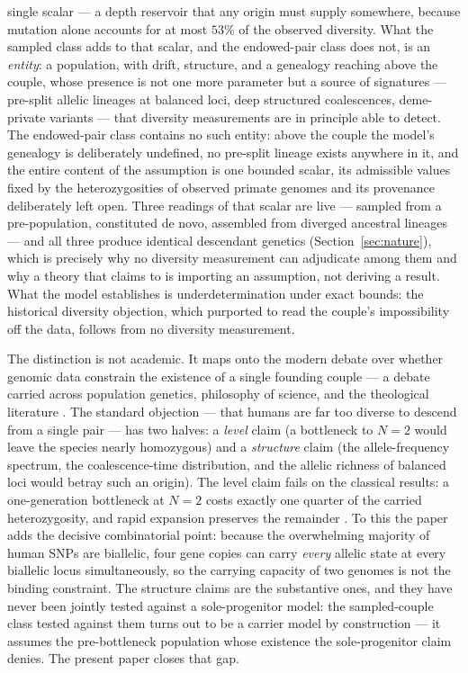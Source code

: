 single scalar --- a depth reservoir that any origin must supply somewhere,
because mutation alone accounts for at most $53\%$ of the observed
diversity. What the sampled class adds to that scalar, and the endowed-pair
class does not, is an \emph{entity}: a population, with drift, structure,
and a genealogy reaching above the couple, whose presence is not one more
parameter but a source of signatures --- pre-split allelic lineages at
balanced loci, deep structured coalescences, deme-private variants --- that
diversity measurements are in principle able to detect. The endowed-pair
class contains no such entity: above the couple the model's genealogy is
deliberately undefined, no pre-split lineage exists anywhere in it, and the
entire content of the assumption is one bounded scalar, its admissible
values fixed by the heterozygosities of observed primate genomes and its
provenance deliberately left open. Three readings of that scalar are live
--- sampled from a pre-population, constituted de novo, assembled from
diverged ancestral lineages --- and all three produce identical descendant
genetics (Section~\ref{sec:nature}), which is precisely why no diversity
measurement can adjudicate among them and why a theory that claims to is
importing an assumption, not deriving a result. What the model establishes
is underdetermination under exact bounds: the historical diversity
objection, which purported to read the couple's impossibility off the data,
follows from no diversity measurement.

The distinction is not academic. It maps onto the modern debate over whether
genomic data constrain the existence of a single founding couple --- a debate
carried across population genetics, philosophy of science, and the
theological literature \citep{Gauger2012,Swamidass2019,HossjerGauger2019}.
The standard objection --- that humans
are far too diverse to descend from a single pair --- has two halves: a
\emph{level} claim (a bottleneck to $N=2$ would leave the species nearly
homozygous) and a \emph{structure} claim (the allele-frequency spectrum, the
coalescence-time distribution, and the allelic richness of balanced loci
would betray such an origin). The level claim fails on the classical results:
a one-generation bottleneck at $N=2$ costs exactly one quarter of the
carried heterozygosity, and rapid expansion preserves the remainder
\citep{Nei1975,SlatkinExcoffier2012}. To this the paper adds the decisive
combinatorial point: because the overwhelming majority of human SNPs are
biallelic, four gene copies can carry \emph{every} allelic state at every
biallelic locus simultaneously, so the carrying capacity of two genomes is
not the binding constraint. The structure claims are the
substantive ones, and they have never been jointly tested against a
sole-progenitor model: the sampled-couple class tested against them
turns out to be a carrier model by construction --- it assumes the
pre-bottleneck population whose existence the sole-progenitor claim denies.
The present paper closes that gap.

